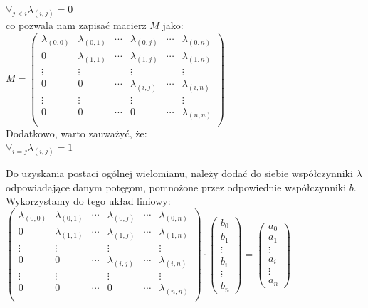 \documentclass[a4paper,12pt]{article}
\newcommand{\id}{\noindent}
\newcommand{\el}[2]{\lambda_{(#1, #2)}}
\newcommand{\fa}[1]{\displaystyle\mathop{\forall}_{#1}}
\begin{document}
$\fa{j<i}\el{i}{j} = 0$ \\

\id
co pozwala nam zapisać macierz $M$ jako: \\

$M = \begin{pmatrix}
\lambda_{(0,0)} & \el{0}{1} & \cdots & \el{0}{j} & \cdots & \el{0}{n}\\ 
0 & \lambda_{(1,1)} & \cdots & \el{1}{j} & \cdots & \el{1}{n} \\ 
\vdots & \vdots & & \vdots & & \vdots\\ 
0 & 0 & \cdots & \lambda_{(i,j)} & \cdots & \el{i}{n}\\ 
\vdots & \vdots &  & \vdots &  & \vdots\\ 
0 & 0 & \cdots & 0 & \cdots & \lambda_{(n,n)}\\ 
\end{pmatrix}$ \\

\id
Dodatkowo, warto zauważyć, że: \\

$\fa{i=j}\el{i}{j}=1$ \\

\newpage

\id
Do uzyskania postaci ogólnej wielomianu, należy dodać do siebie współczynniki $\lambda$ odpowiadające danym potęgom, pomnożone przez odpowiednie współczynniki $b$. Wykorzystamy do tego układ liniowy: \\

$\begin{pmatrix}
\lambda_{(0,0)} & \el{0}{1} & \cdots & \el{0}{j} & \cdots & \el{0}{n}\\ 
0 & \lambda_{(1,1)} & \cdots & \el{1}{j} & \cdots & \el{1}{n} \\ 
\vdots & \vdots & & \vdots & & \vdots\\ 
0 & 0 & \cdots & \lambda_{(i,j)} & \cdots & \el{i}{n}\\ 
\vdots & \vdots &  & \vdots &  & \vdots\\ 
0 & 0 & \cdots & 0 & \cdots & \lambda_{(n,n)}\\ 
\end{pmatrix}\cdot
\begin{pmatrix}
b_0 \\
b_1 \\
\vdots \\
b_i \\
\vdots \\
b_n
\end{pmatrix}
=
\begin{pmatrix}
a_0 \\
a_1 \\
\vdots \\
a_i \\
\vdots \\
a_n
\end{pmatrix}$ \\
\end{document}
